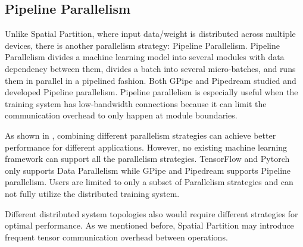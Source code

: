 \documentclass[sigplan, nonacm]{acmart}\settopmatter{printfolios=true,printccs=false,printacmref=false}
\begin{document}
 \subsection{Pipeline Parallelism}
 Unlike Spatial Partition, where input data/weight is distributed across multiple devices, there is another parallelism strategy: Pipeline Parallelism. Pipeline Parallelism divides a machine learning model into several modules with data dependency between them, divides a batch into several micro-batches, and runs them in parallel in a pipelined fashion. Both GPipe\cite{huang2019gpipe} and Pipedream\cite{narayanan2019pipedream} studied and developed Pipeline parallelism. Pipeline parallelism is especially useful when the training system has low-bandwidth connections because it can limit the communication overhead to only happen at module boundaries.\par
 As shown in \cite{krizhevsky2014one}, combining different parallelism strategies can achieve better performance for different applications. However, no existing machine learning framework can support all the parallelism strategies. TensorFlow\cite{abadi2016tensorflow} and Pytorch\cite{paszke2019pytorch} only supports Data Parallelism while GPipe\cite{huang2019gpipe} and Pipedream\cite{narayanan2019pipedream} supports Pipeline parallelism. Users are limited to only a subset of Parallelism strategies and can not fully utilize the distributed training system.\par
  Different distributed system topologies also would require different strategies for optimal performance. As we mentioned before, Spatial Partition may introduce frequent tensor communication overhead between operations.
\end{document}

